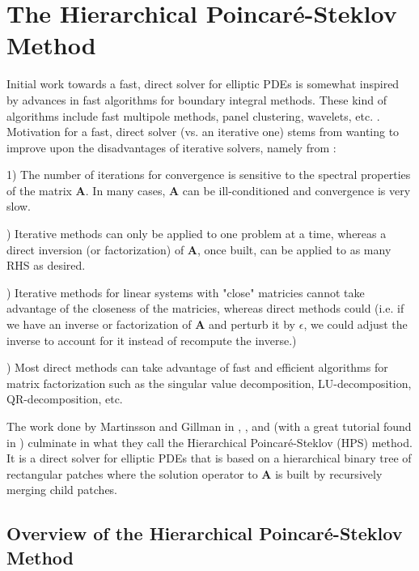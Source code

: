 \section{The Hierarchical Poincaré-Steklov Method}

Initial work towards a fast, direct solver for elliptic PDEs is somewhat inspired by advances in fast algorithms for boundary integral methods. These kind of algorithms include fast multipole methods, panel clustering, wavelets, etc. \cite{martinsson2004fast}. Motivation for a fast, direct solver (vs. an iterative one) stems from wanting to improve upon the disadvantages of iterative solvers, namely from \cite{martinsson2004fast}:

\begin{adjustwidth}{0.25cm}{}
    1) The number of iterations for convergence is sensitive to the spectral properties of the matrix $\textbf{A}$. In many cases, $\textbf{A}$ can be ill-conditioned and convergence is very slow.

    ) Iterative methods can only be applied to one problem at a time, whereas a direct inversion (or factorization) of $\textbf{A}$, once built, can be applied to as many RHS as desired.

    ) Iterative methods for linear systems with "close" matricies cannot take advantage of the closeness of the matricies, whereas direct methods could (i.e. if we have an inverse or factorization of $\textbf{A}$ and perturb it by $\epsilon$, we could adjust the inverse to account for it instead of recompute the inverse.)

    ) Most direct methods can take advantage of fast and efficient algorithms for matrix factorization such as the singular value decomposition, LU-decomposition, QR-decomposition, etc.
\end{adjustwidth}

The work done by Martinsson and Gillman in \cite{martinsson2004fast}, \cite{MARTINSSON2013460}, and \cite{gillman2014direct} (with a great tutorial found in \cite{martinsson2015hierarchical}) culminate in what they call the Hierarchical Poincaré-Steklov (HPS) method. It is a direct solver for elliptic PDEs that is based on a hierarchical binary tree of rectangular patches where the solution operator to $\textbf{A}$ is built by recursively merging child patches.

\subsection{Overview of the Hierarchical Poincaré-Steklov Method}

